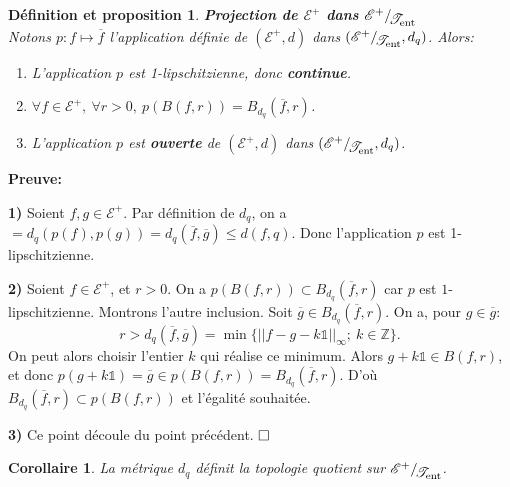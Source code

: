 \documentclass[11pt,a4 paper]{article}
\newtheorem{definitionproposition}[theoreme]{Définition et proposition}
\newtheorem{corollaire}[theoreme]{Corollaire}
\newcommand{\Zbb}{\mathbb{Z}}
\newcommand{\Ec}{\mathcal{E}}
\newcommand{\Tent}{\mathcal{T}_{\mathrm{ent}}}
\newcommand*{\EnsembleQuotient}[2]%
{\ensuremath{%
		#1/\!\raisebox{-.65ex}{\ensuremath{\mathcal{#2}}}}}
\newenvironment{coro}{\begin{box_coro}\begin{corollaire}}{\end{corollaire}\end{box_coro}}
\newenvironment{defippt}{\begin{box_defippt}\begin{definitionproposition}}{\end{definitionproposition}\end{box_defippt}}
\begin{document}
	

\begin{defippt}\label{préli p}\textbf{Projection de $\Ec^+$ dans 		  $\EnsembleQuotient{\mathcal{E}^+}{\Tent}$}\\
		Notons $p:f\mapsto \overline{f}$ l'application définie de $(\Ec^+,d)$ dans $(\EnsembleQuotient{\mathcal{E}^+}{\Tent},d_q)$.
		 Alors:
		\begin{enumerate}
				\item L'application $p$ est 1-lipschitzienne, donc \textbf{continue}.
				\item $\forall f\in \Ec^+,\ \forall r>0,\ p(B(f,r))=B_{d_q}(\overline{f},r)$.
				\item L'application $p$ est \textbf{ouverte} de $(\Ec^+,d)$ dans $(\EnsembleQuotient{\mathcal{E}^+}{\Tent},d_q)$.
		\end{enumerate}
\end{defippt}


	\textbf{Preuve:}
	\par \textbf{1)} Soient $f, g \in \Ec^+$. Par définition de $d_q$, on a $=d_q(p(f),p(g))=d_q(\overline{f},\overline{g})\leq d(f,q)$. Donc l'application $p$ est 1-lipschitzienne.\\
	
	\par \textbf{2)} Soient $f \in \Ec^+$, et $r>0$. On a $p(B(f,r))\subset B_{d_q}(\overline{f},r)$ car $p$ est $1$-lipschitzienne. Montrons l'autre inclusion. Soit $\overline{g} \in B_{d_q}(\overline{f},r)$. On a, pour $g\in \overline{g}$:
		$$r>d_q(\overline{f},\overline{g})=\min\lbrace ||f-g-k\mathds{1}||_{\infty};\ k \in \Zbb\rbrace.$$
	On peut alors choisir l'entier $k$ qui réalise ce minimum. Alors $g	+k\mathds{1} \in B(f,r)$, et donc $p(g+k\mathds{1})=\overline{g} \in p(B(f,r))=B_{d_q}(\overline{f},r)$. D'où $B_{d_q}(\overline{f},r) \subset p(B(f,r))$ et l'égalité souhaitée.\\
	
	\par \textbf{3)} Ce point découle du point précédent. $\hfill \square$\\












	
\begin{coro}\label{distance dq donne topo quotient}
		La métrique $d_q$ définit la topologie quotient sur $\EnsembleQuotient{\Ec^+}{\Tent}$.
\end{coro}
	
\end{document}
